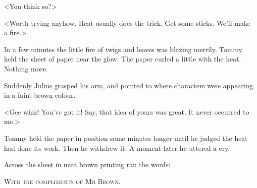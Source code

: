 <You think so?>

<Worth trying anyhow. Heat usually does the trick. Get some sticks. We'll make a fire.>

In a few minutes the little fire of twigs and leaves was blazing merrily. Tommy held the sheet of paper near the glow. The paper curled a little with the heat. Nothing more.

Suddenly Julius grasped his arm, and pointed to where characters were appearing in a faint brown colour.

<Gee whiz! You've got it! Say, that idea of yours was great. It never occurred to me.>

Tommy held the paper in position some minutes longer until he judged the heat had done its work. Then he withdrew it. A moment later he uttered a cry.

Across the sheet in neat brown printing ran the words: 

\bigskip
\centerline{\large\scshape With the compliments of Mr Brown.}